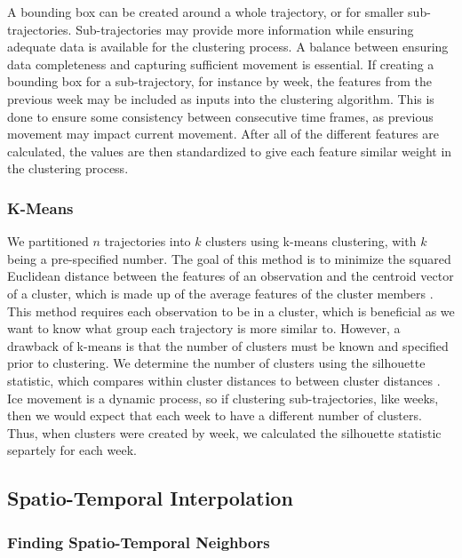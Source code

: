 \documentclass[12pt]{article}
\begin{document}
A bounding box can be created around a whole trajectory, or for smaller
sub-trajectories. Sub-trajectories may provide more information while
ensuring adequate data is available for the clustering process. A
balance between ensuring data completeness and capturing sufficient
movement is essential. If creating a bounding box for a sub-trajectory,
for instance by week, the features from the previous week may be
included as inputs into the clustering algorithm. This is done to ensure
some consistency between consecutive time frames, as previous movement
may impact current movement. After all of the different features are
calculated, the values are then standardized to give each feature
similar weight in the clustering process.

\hypertarget{k-means}{%
\subsubsection{K-Means}\label{k-means}}

We partitioned \(n\) trajectories into \(k\) clusters using k-means
clustering, with \(k\) being a pre-specified number. The goal of this
method is to minimize the squared Euclidean distance between the
features of an observation and the centroid vector of a cluster, which
is made up of the average features of the cluster members
\citep{steinley_kmeans_2006}. This method requires each observation to
be in a cluster, which is beneficial as we want to know what group each
trajectory is more similar to. However, a drawback of k-means is that
the number of clusters must be known and specified prior to clustering.
We determine the number of clusters using the silhouette statistic,
which compares within cluster distances to between cluster distances
\citep{kodinariya_2013}. Ice movement is a dynamic process, so if
clustering sub-trajectories, like weeks, then we would expect that each
week to have a different number of clusters. Thus, when clusters were
created by week, we calculated the silhouette statistic separtely for
each week.

\hypertarget{spatio-temporal-interpolation}{%
\subsection{Spatio-Temporal
Interpolation}\label{spatio-temporal-interpolation}}

\hypertarget{finding-spatio-temporal-neighbors}{%
\subsubsection{Finding Spatio-Temporal
Neighbors}\label{finding-spatio-temporal-neighbors}}
\end{document}
